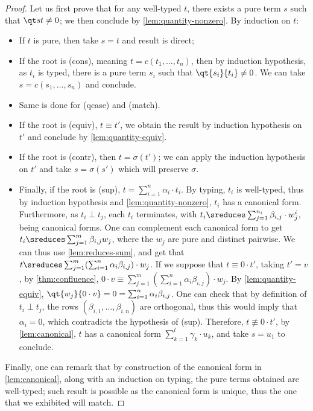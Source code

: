 \begin{proof}
  Let us first prove that for any well-typed $t$, there exists a pure
  term $s$ such that $\qt st \neq 0$;
  we then conclude by \autoref{lem:quantity-nonzero}.
  By induction on $t$:

  \begin{itemize}

    \item If $t$ is pure, then take $s = t$ and result is direct;

    \item If the root is (cons), meaning $t = c(t_1, \dots, t_n)$,
      then by induction hypothesis,
      as $t_i$ is typed, there is a pure term $s_i$ such that $\qt
      {s_i} {t_i} \neq 0$.
      We can take $s = c(s_1, \dots, s_n)$ and conclude.

    \item Same is done for (qcase) and (match).

    \item If the root is (equiv), $t \equiv t'$, we obtain the result
      by induction hypothesis on $t'$ and conclude by
      \autoref{lem:quantity-equiv}.

    \item If the root is (contr), then $t = \sigma(t')$; we can apply
      the induction hypothesis on $t'$ and take $s = \sigma(s')$
      which will preserve $\sigma$.

    \item Finally, if the root is (sup), $t = \sum_{i=1}^n \alpha_i \cdot t_i$.
      By typing, $t_i$ is well-typed, thus by induction hypothesis and
      \autoref{lem:quantity-nonzero}, $t_i$ has a canonical form.
      Furthermore, as $t_i \perp t_j$, each $t_i$ terminates,
      with $t_i \sreduces \sum_{j=1}^{n_i} \beta_{i,j} \cdot w_j^i$,
      being canonical forms. One can complement each canonical
      form to get $t_i \sreduces \sum_{j=1}^m \beta_{i,j} w_j$,
      where the $w_j$ are pure and distinct pairwise.
      We can thus use \autoref{lem:reduces-sum}, and get that
      $t \sreduces \sum_{j=1}^m (\sum_{i=1}^n \alpha_i \beta_{i,j}) \cdot w_j$.
      If we suppose that $t \equiv 0 \cdot t'$, taking $t' = v$,
      by \autoref{thm:confluence}, $0 \cdot v \equiv \sum_{j=1}^m
      (\sum_{i=1}^n \alpha_i \beta_{i,j}) \cdot w_j$.
      By \autoref{lem:quantity-equiv}, $\qt {w_j}{0 \cdot v} = 0 =
      \sum_{i=1}^n \alpha_i \beta_{i,j}$.
      One can check that by definition of $t_i \perp t_j$, the rows
      $(\beta_{i,1}, \dots, \beta_{i,n})$
      are orthogonal, thus this would imply that $\alpha_i = 0$,
      which contradicts
      the hypothesis of (sup). Therefore, $t \not\equiv 0 \cdot t'$,
      by \autoref{lem:canonical}, $t$ has a canonical form
      $\sum_{k=1}^l \gamma_k \cdot u_k$,
      and take $s = u_1$ to conclude.
  \end{itemize}

  Finally, one can remark that by construction of the canonical form in
  \autoref{lem:canonical}, along with an induction on typing, the pure
  terms obtained are well-typed; such result is possible as the canonical
  form is unique, thus the one that we exhibited will match.
\end{proof}

